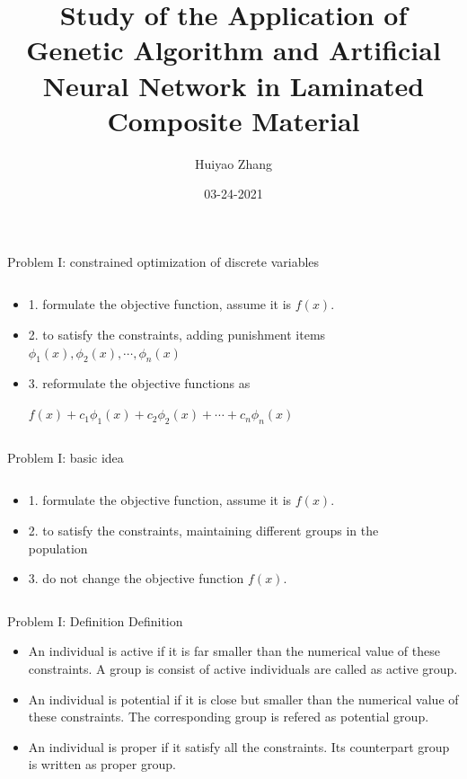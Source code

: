 \documentclass{beamer}
\title{Study of the Application of Genetic
Algorithm and Artificial Neural Network
in Laminated Composite Material}
\author{Huiyao Zhang}
\institute{Kyoto Institue of Technology}
\date{03-24-2021}
\begin{document}
\begin{frame}
    \titlepage
\end{frame}


\begin{frame}{Problem I: constrained optimization of discrete variables}
	\begin{columns}
		\begin{column}{0.65\textwidth}
			\begin{itemize}
				\item  1. formulate the objective function, assume it is $f(x)$.
				\item  2. to satisfy the constraints, adding punishment items
					$\phi_1(x),\phi_2(x),\cdots, \phi_n(x)$ 
				\item  3. reformulate the objective functions as

					$f(x)+c_1\phi_1(x)+c_2\phi_2(x)+ \cdots + c_n\phi_n(x)$
			\end{itemize}
		\end{column}
		\begin{column}{0.35\textwidth}
			
		\end{column}
	\end{columns}
\end{frame}


\begin{frame}{Problem I: basic idea}
	\begin{columns}
		\begin{column}{0.6\textwidth}
			\begin{itemize}
				\item  1. formulate the objective function, assume it is $f(x)$.
				\item  2. to satisfy the constraints, maintaining different groups in the population 
				\item  3. do not change the objective function $f(x)$.
			\end{itemize}
		\end{column}
		\begin{column}{0.4\textwidth}
			
		\end{column}
	\end{columns}
\end{frame}

\begin{frame}{Problem I: Definition}
	Definition
		\begin{itemize}
			\item An individual is active if it is far smaller than the
				numerical value of these constraints. A group is consist of
				active individuals are called as active group.
			\item An individual is potential if it is close but smaller than the
				numerical value of these constraints. The corresponding group is
				refered as potential group.
			\item An individual is proper if it satisfy all the constraints. Its
				counterpart group is written as proper group.
		\end{itemize}
\end{frame}
\end{document}
